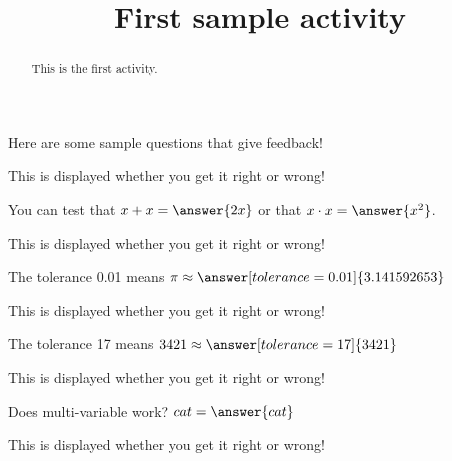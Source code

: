 \documentclass[handout]{ximera}
\title{First sample activity}
\begin{document}
\begin{abstract} This is the first activity.
\end{abstract}


\maketitle


Here are some sample questions that give feedback!

\begin{problem}
\begin{multipleChoice}
\end{multipleChoice}
\begin{feedback} This is displayed whether you get it right or wrong! \end{feedback}
\end{problem}

\begin{problem}
   You can test that $x + x = \answer{2x}$ or that $x \cdot x = \answer{x^2}$.
\begin{feedback} This is displayed whether you get it right or wrong! \end{feedback}
\end{problem}

\begin{problem}
   The tolerance 0.01 means $\pi \approx \answer[tolerance=0.01]{3.141592653}$
\begin{feedback} This is displayed whether you get it right or wrong! \end{feedback}
\end{problem}

\begin{problem}
   The tolerance 17 means $3421 \approx \answer[tolerance=17]{3421}$
\begin{feedback} This is displayed whether you get it right or wrong! \end{feedback}
\end{problem}

\begin{problem}
Does multi-variable work? $ cat = \answer{cat}$
\begin{feedback} This is displayed whether you get it right or wrong! \end{feedback}
\end{problem}
\end{document}
